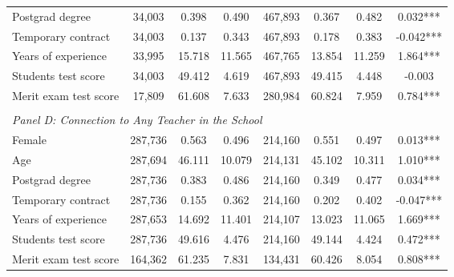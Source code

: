 \begin{tabular}{lccccccc}
Postgrad degree & 34,003 & 0.398 & 0.490 & 467,893 & 0.367 & 0.482 & 0.032***\\
Temporary contract & 34,003 & 0.137 & 0.343 & 467,893 & 0.178 & 0.383 & -0.042***\\
Years of experience & 33,995 & 15.718 & 11.565 & 467,765 & 13.854 & 11.259 & 1.864***\\
Students test score & 34,003 & 49.412 & 4.619 & 467,893 & 49.415 & 4.448 & -0.003\\
Merit exam test score & 17,809 & 61.608 & 7.633 & 280,984 & 60.824 & 7.959 & 0.784***\\
\\
 \multicolumn{8}{l}{\textit{Panel D: Connection to Any Teacher in the School}} \\
  Female & 287,736 & 0.563 & 0.496 & 214,160 & 0.551 & 0.497 & 0.013***\\
Age & 287,694 & 46.111 & 10.079 & 214,131 & 45.102 & 10.311 & 1.010***\\
Postgrad degree & 287,736 & 0.383 & 0.486 & 214,160 & 0.349 & 0.477 & 0.034***\\
Temporary contract & 287,736 & 0.155 & 0.362 & 214,160 & 0.202 & 0.402 & -0.047***\\
Years of experience & 287,653 & 14.692 & 11.401 & 214,107 & 13.023 & 11.065 & 1.669***\\
Students test score & 287,736 & 49.616 & 4.476 & 214,160 & 49.144 & 4.424 & 0.472***\\
Merit exam test score & 164,362 & 61.235 & 7.831 & 134,431 & 60.426 & 8.054 & 0.808***\\
\hline\end{tabular}\\
